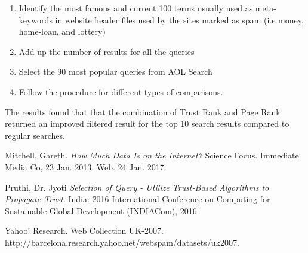 \documentclass[letter, 11pt]{article}
\begin{document}
\begin{enumerate}[label=\hspace{15pt} \bf Step \arabic*: ]
  \item Identify the most famous and current 100 terms usually used as meta-keywords in website header files used by the sites marked as spam (i.e money, home-loan, and lottery)
  \item Add up the number of results for all the queries
  \item Select the 90 most popular queries from AOL Search
  \item Follow the procedure for different types of comparisons.
\end{enumerate}
\vspace{-7pt}
\begin{doublespace}
\hspace{14pt} The results found that that the combination of Trust Rank and Page Rank returned an improved filtered result for the top 10 search results compared to regular searches.
\end{doublespace}
\vspace{-10pt}
\begin{thebibliography}{9}

Mitchell, Gareth. \textit{How Much Data Is on the Internet?} Science Focus. Immediate Media Co, 23 Jan. 2013. Web. 24 Jan. 2017.

 Pruthi, Dr. Jyoti \emph{Selection of Query - Utilize Trust-Based Algorithms to Propagate Trust}. India: 2016 International Conference on Computing for Sustainable Global Development (INDIACom), 2016

 Yahoo! Research. Web Collection UK-2007. \\ http://barcelona.research.yahoo.net/webspam/datasets/uk2007.
\end{thebibliography}
\end{document}
